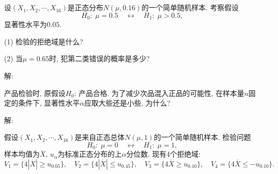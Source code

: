 \documentclass[standard]{ExBook}
\begin{document}

\section{}

\begin{qitems}
    \begin{bbox}
    \begin{shaded}
        \qitem
设$\left(X_1, X_2, \cdots, X_{16}\right)$是正态分布$N(\mu, 0.16)$的一个简单随机样本. 考察假设
\[
H_0: \; \mu = 0.5 \quad \longleftrightarrow \quad H_1: \; \mu > 0.5,
\]
显著性水平为$0.05$.

(1) 检验的拒绝域是什么?

(2) 当$\mu = 0.65$时, 犯第二类错误的概率是多少?
    \end{shaded}
    \end{bbox}

\vspace{-5em}

    \begin{bbox}
解: 
    \end{bbox}

\vspace{-5em}

    \begin{bbox} 
    \begin{shaded}
        \qitem
产品检验时, 原假设$H_0$: 产品合格. 为了减少次品混入正品的可能性, 在样本量$n$固定的条件下, 显著性水平$\alpha$应取大些还是小些, 为什么?
    \end{shaded}
    \end{bbox}

\vspace{-5em}

    \begin{bbox}
解: 
    \end{bbox}

\vspace{-5em}

    \begin{bbox} 
    \begin{shaded}
        \qitem
假设$\left(X_1, X_2, \cdots, X_{16}\right)$是来自正态总体$N(\mu, 1)$的一个简单随机样本. 检验问题
\[
H_0: \; \mu = 0 \quad \longleftrightarrow \quad H_1: \; \mu = 1,
\]
样本均值为$\bar X$, $u_{\alpha}$为标准正态分布的上$\alpha$分位数. 现有4个拒绝域:
\[
V_1 = \{4|\overline{X}| \ge u_{0.05}\}, \quad
V_2 = \{4|\overline{X}| \le u_{0.45}\}, \quad
V_3 = \{4\overline{X} \ge u_{0.10}\}, \quad
V_4 = \{4\overline{X} \le -u_{0.10}\}.
\]


\end{shaded}
\end{bbox}
\end{qitems}
\end{document}
